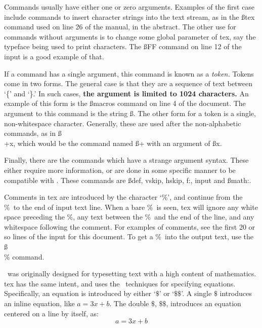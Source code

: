 Commands usually have either one or zero arguments. Examples of
the first case include commands to insert character strings into
the text stream, as in the {\ss tex} command used on line 26 of
the manual, in the abstract. The other use for commands without
arguments is to change some global parameter of tex, say the
typeface being used to print characters. The {\ss FF} command on
line 12 of the input is a good example of that.

If a command has a single argument, this command is known as a
{\it token.} Tokens come in two forms. The general case is that
they are a sequence of text between `\{' and `\}.' In such cases,
{\bf the argument is limited to 1024 characters.} An example of
this form is the {\ss macros} command on line 4 of the document.
The argument to this command is the string {\ss \macname.} The
other form for a token is a single, non-whitespace character.
Generally, these are used after the non-alphabetic commands, as
in {\ss \\+x,} which would be the command named {\ss +} with an
argument of {\ss x.}

Finally, there are the commands which have a strange argument
syntax. These either require more information, or are done in
some specific manner to be compatible with \tex. These commands
are {\ss def, vskip, hskip, f:, input} and {\ss math:.}


Comments in tex are introduced by the character `\%', and
continue from the \%\ to the end of input text line. When a bare
\%\ is seen, tex will ignore any white space preceding the \%,
any text between the \%\ and the end of the line, and any
whitespace following the comment. For examples of comments, see
the first 20 or so lines of the input for this document. To get a
\%\ into the output text, use the {\ss \\\%} command.


\tex\ was originally designed for typesetting text with a high
content of mathematics. tex has the same intent, and uses the
\tex\ techniques for specifying equations. Specifically, an
equation is introduced by either `$\$$' or `$\$\$$'. A single
$\$$ introduces an inline equation, like $a=3x+b.$ The
double $\$$, $\$\$$, introduces an equation centered on
a line by itself, as: $$a=3x+b$$

